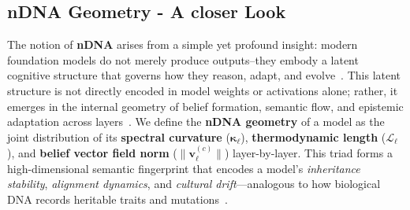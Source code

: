 \subsection{nDNA Geometry - A closer Look}

\noindent
The notion of \textbf{nDNA} arises from a simple yet profound insight: modern foundation models do not merely produce outputs--they embody a latent cognitive structure that governs how they reason, adapt, and evolve~\citep{bommasani2023foundation, ganguli2023reducing}. This latent structure is not directly encoded in model weights or activations alone; rather, it emerges in the internal geometry of belief formation, semantic flow, and epistemic adaptation across layers~\citep{liu2023hidden, wang2021geomtransformer}. We define the \textbf{nDNA geometry} of a model as the joint distribution of its 
\textbf{spectral curvature} ($\boldsymbol{\kappa_\ell}$), 
\textbf{thermodynamic length} ($\boldsymbol{\mathcal{L}_\ell}$), and 
\textbf{belief vector field norm} ($\| \mathbf{v}_\ell^{(c)} \|$)
layer-by-layer. 
This triad forms a high-dimensional semantic fingerprint that encodes a model's \emph{inheritance stability}, 
\emph{alignment dynamics}, 
and \emph{cultural drift}---analogous to how biological DNA records heritable traits and mutations~\citep{shen2023beliefgeometry, bakker2024uniting}.









